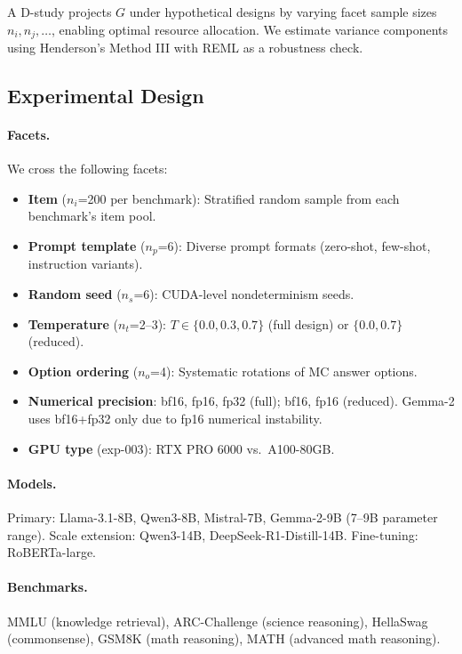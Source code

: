\documentclass[11pt,twocolumn]{article}
\begin{document}
A D-study projects $G$ under hypothetical designs by varying facet sample sizes $n_i, n_j, \ldots$, enabling optimal resource allocation.
We estimate variance components using Henderson's Method III \citep{brennan2001} with REML as a robustness check.

\subsection{Experimental Design}

\paragraph{Facets.}
We cross the following facets:
\begin{itemize}
\item \textbf{Item} ($n_i$=200 per benchmark): Stratified random sample from each benchmark's item pool.
\item \textbf{Prompt template} ($n_p$=6): Diverse prompt formats (zero-shot, few-shot, instruction variants).
\item \textbf{Random seed} ($n_s$=6): CUDA-level nondeterminism seeds.
\item \textbf{Temperature} ($n_t$=2--3): $T \in \{0.0, 0.3, 0.7\}$ (full design) or $\{0.0, 0.7\}$ (reduced).
\item \textbf{Option ordering} ($n_o$=4): Systematic rotations of MC answer options.
\item \textbf{Numerical precision}: bf16, fp16, fp32 (full); bf16, fp16 (reduced). Gemma-2 uses bf16+fp32 only due to fp16 numerical instability.
\item \textbf{GPU type} (exp-003): RTX PRO 6000 vs.\ A100-80GB.
\end{itemize}

\paragraph{Models.}
Primary: Llama-3.1-8B, Qwen3-8B, Mistral-7B, Gemma-2-9B (7--9B parameter range).
Scale extension: Qwen3-14B, DeepSeek-R1-Distill-14B.
Fine-tuning: RoBERTa-large.

\paragraph{Benchmarks.}
MMLU (knowledge retrieval), ARC-Challenge (science reasoning), HellaSwag (commonsense), GSM8K (math reasoning), MATH (advanced math reasoning).
\end{document}

